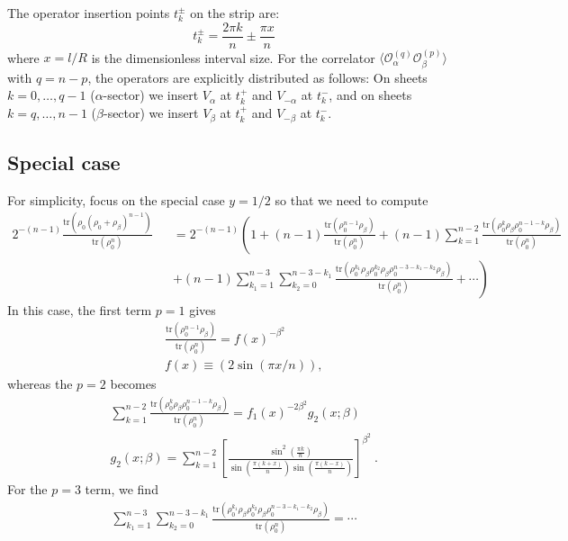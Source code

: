 \documentclass[11pt]{article}
\newcommand{\tr}{\mathrm{tr}}
\newcommand{\nn}{\nonumber}
\newcommand{\lb}{\left(}
\newcommand{\rb}{\right)}
\begin{document}
  The operator insertion points $t_{k}^{\pm}$ on the strip are:
  \begin{equation}
    t_{k}^{\pm}= \frac{2\pi k}{n}\pm \frac{\pi x}{n}
  \end{equation}
  where $x = l/R$ is the dimensionless interval size. For the correlator $\langle
  \mathcal{O}_{\alpha}^{(q)}\mathcal{O}_{\beta}^{(p)}\rangle$ with $q=n-p$, the
  operators are explicitly distributed as follows: On sheets $k=0, \dots, q-1$ ($\alpha$-sector)
  we insert $V_{\alpha}$ at $t_{k}^{+}$ and $V_{-\alpha}$ at $t_{k}^{-}$, and on
  sheets $k=q, \dots, n-1$ ($\beta$-sector) we insert $V_{\beta}$ at $t_{k}^{+}$
  and $V_{-\beta}$ at $t_{k}^{-}$.

  \subsection*{Special case}

  For simplicity, focus on the special case $y=1/2$ so that we need to compute
  \begin{eqnarray}
    2^{-(n-1)}\frac{\tr(\rho_{0}(\rho_{0}+\rho_{\beta})^{n-1})}{\tr(\rho_{0}^{n})}&&=2^{-(n-1)}\lb
    1+(n-1)\frac{\tr(\rho_{0}^{n-1}\rho_{\beta})}{\tr(\rho_{0}^{n})}+(n-1)\sum_{k=1}^{n-2}\frac{\tr(\rho_{0}^{k}\rho_{\beta}\rho_{0}^{n-1-k}\rho_{\beta})}{\tr(\rho_{0}^{n})}
    \right.\nn\\
    &&\left.+(n-1)\sum_{k_1=1}^{n-3}\sum_{k_2=0}^{n-3-k_1}\frac{\tr(\rho_{0}^{k_1}\rho_{\beta}\rho_{0}^{k_2}\rho_{\beta}\rho_{0}^{n-3-k_1-k_2}\rho_{\beta})}{\tr(\rho_{0}^{n})}+\cdots\rb
  \end{eqnarray}
  In this case, the first term $p=1$ gives
  \begin{eqnarray}
    &&\frac{\tr(\rho_{0}^{n-1}\rho_{\beta})}{\tr(\rho_{0}^{n})}=f(x)^{-\beta^2}\nn\\
    &&f(x)\equiv (2\sin(\pi x/n)),
  \end{eqnarray}
  whereas the $p=2$ becomes
  \begin{eqnarray}
    &&\sum_{k=1}^{n-2}\frac{\tr(\rho_{0}^{k}\rho_{\beta}\rho_{0}^{n-1-k}\rho_{\beta})}{\tr(\rho_{0}^{n})}=f_1(x)^{-2\beta^2}
    g_2(x;\beta)\nn\\
    &&g_2(x;\beta) = \sum_{k=1}^{n-2} \left[
    \frac{\sin^{2}\left(\frac{\pi k}{n}\right)}{\sin\left(\frac{\pi(k+x)}{n}\right)
    \sin\left(\frac{\pi(k-x)}{n}\right)}
    \right]^{\beta^2}\ .
  \end{eqnarray}
  For the $p=3$ term, we find
  \begin{eqnarray}
    \sum_{k_1=1}^{n-3}\sum_{k_2=0}^{n-3-k_1}\frac{\tr(\rho_{0}^{k_1}\rho_{\beta}\rho_{0}^{k_2}\rho_{\beta}\rho_{0}^{n-3-k_1-k_2}\rho_{\beta})}{\tr(\rho_{0}^{n})}=\cdots
  \end{eqnarray}
\end{document}
